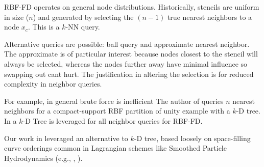 \documentclass{report}
\begin{document}
RBF-FD operates on general node distributions. Historically, stencils are uniform in size ($n$) and generated by selecting the $(n-1)$ true nearest neighbors to a node $x_c$. This is a $k$-NN query. 

Alternative queries are possible: ball query and approximate nearest neighbor. The approximate is of particular interest because nodes closest to the stencil will always be selected, whereas the nodes further away have minimal influence so swapping out cant hurt. The justification in altering the selection is for reduced complexity in neighbor queries.  





For example, in general brute force is inefficient 
The author of \cite{Fasshauer2007} queries $n$ nearest neighbors for a compact-support RBF partition of unity example with a $k$-D tree. In \cite{FlyerLehto11,FornbergLehto11} a $k$-D Tree is leveraged for all neighbor queries for RBF-FD. 

Our work in \cite{BolligFlyerErlebacher2012} leveraged an alternative to $k$-D tree, based loosely on space-filling curve orderings common in Lagrangian schemes like Smoothed Particle Hydrodynamics (e.g., \cite{IanThesis}, \cite{Kelager}). %
\end{document}
